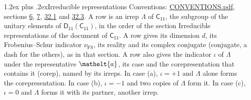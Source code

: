 \documentclass[10pt,a4paper]{article}
\makeatletter
\renewcommand\section{\@startsection{section}{1}{\z@}{-3ex plus -1ex minus -.2ex}%
  {1.2ex plus .2ex}{\normalfont\large\sffamily\bfseries\color{parttitle}}}
\numberwithin{equation}{section}
\newcommand{\eltfont}[1]{{\let\sigma\eltsigma\mathelt{#1}}}
\newcommand{\grp}[1]{\mathsf{#1}}
\newcommand{\elt}[1]{\eltfont{#1}}
\newcommand{\fsind}{\nu_{\mathrm{FS}}}
\makeatother
\begin{document}
\section{Irreducible representations}\label{s:irreps}
Conventions: \href{../../CONVENTIONS.pdf}{CONVENTIONS.pdf}, sections \href{../../../rotation/CONVENTIONS.pdf\#conv.6}{6}, \href{../../../rotation/CONVENTIONS.pdf\#conv.7}{7}, \href{../../CONVENTIONS.pdf\#conv.32.1}{32.1} and \href{../../CONVENTIONS.pdf\#conv.32.3}{32.3}.
\leavevmode\label{n:irrep.Delta}A row is an irrep $\Lambda$ of $\grp{C_{11}}$, the subgroup of the unitary elements of $\grp{D_{11}}(\grp{C_{11}})$, in the order of the section Irreducible representations of the document of \href{../../../rotation/data/pdf/C11.pdf}{$\grp{C_{11}}$}. \label{n:index.dimension}\label{n:index.frobenius}\label{n:head.irrep}\label{n:head.reality}\label{n:head.conjugate}A row gives its dimension $d$, its Frobenius--Schur indicator $\fsind$, its reality and its complex conjugate (conjugate, a dash for the others), as in that section. \label{n:head.case.corep}\label{n:head.corep}A row also gives the indicator $\iota$ of $\Lambda$ under the representative $\elt{a}$, its case and the corepresentation that contains it (corep), named by its irreps. In case (a), $\iota = +1$ and $\Lambda$ alone forms the corepresentation. In case (b), $\iota = -1$ and two copies of $\Lambda$ form it. In case (c), $\iota = 0$ and $\Lambda$ forms it with its partner, another irrep.
\setlength{\emergencystretch}{2em}\par\setlength{\emergencystretch}{0pt}
\end{document}
